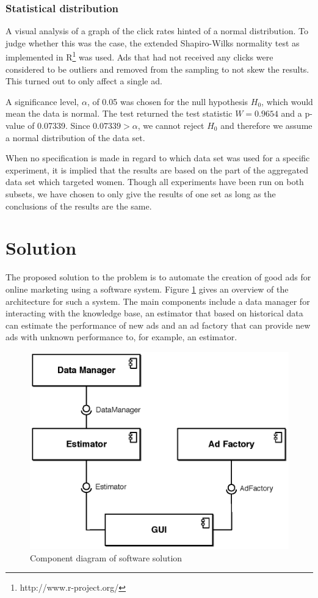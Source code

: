 \documentclass{sig-alternate}
\begin{document}
\subsubsection{Statistical distribution}
A visual analysis of a graph of the click rates hinted of a normal distribution. To judge whether this was the case, the extended Shapiro-Wilks normality test \citep{Royston1982} as implemented in R\footnote{http://www.r-project.org/} was used. Ads that had not received any clicks were considered to be outliers and removed from the sampling to not skew the results. This turned out to only affect a single ad.

A significance level, \(\alpha\), of 0.05 was chosen for the null hypothesis \(H_0\), which would mean the data is normal. The test returned the test statistic \(W = 0.9654\) and a p-value of 0.07339. Since \(0.07339 > \alpha\), we cannot reject \(H_0\) and therefore we assume a normal distribution of the data set.

When no specification is made in regard to which data set was used for a specific experiment, it is implied that the results are based on the part of the aggregated data set which targeted women. Though all experiments have been run on both subsets, we have chosen to only give the results of one set as long as the conclusions of the results are the same.

\section{Solution}
\label{ch:Solution}
The proposed solution to the problem is to automate the creation of good ads for online marketing using a software system. Figure \ref{fig:SWArchitecture} gives an overview of the architecture for such a system. The main components include a data manager for interacting with the knowledge base, an estimator that based on historical data can estimate the performance of new ads and an ad factory that can provide new ads with unknown performance to, for example, an estimator.

\begin{figure}[htpb]
	\centering
	\includegraphics[width=\columnwidth]{sw-architecture.eps}
	\caption{Component diagram of software solution}
	\label{fig:SWArchitecture}
\end{figure}
\end{document}
